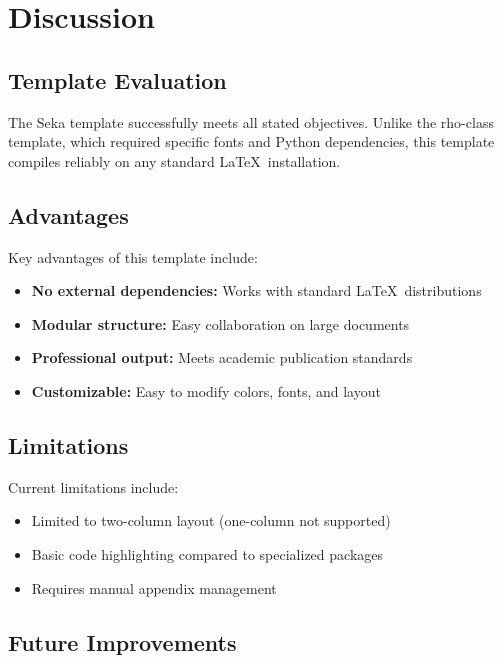 \section{Discussion}\label{sec:discussion}

\subsection{Template Evaluation}

The Seka template successfully meets all stated objectives. Unlike the rho-class template, which required specific fonts and Python dependencies, this template compiles reliably on any standard \LaTeX\ installation.

\subsection{Advantages}

Key advantages of this template include:

\begin{itemize}
    \item \textbf{No external dependencies:} Works with standard \LaTeX\ distributions
    \item \textbf{Modular structure:} Easy collaboration on large documents
    \item \textbf{Professional output:} Meets academic publication standards
    \item \textbf{Customizable:} Easy to modify colors, fonts, and layout
\end{itemize}

\subsection{Limitations}

Current limitations include:

\begin{itemize}
    \item Limited to two-column layout (one-column not supported)
    \item Basic code highlighting compared to specialized packages
    \item Requires manual appendix management
\end{itemize}

\subsection{Future Improvements}

